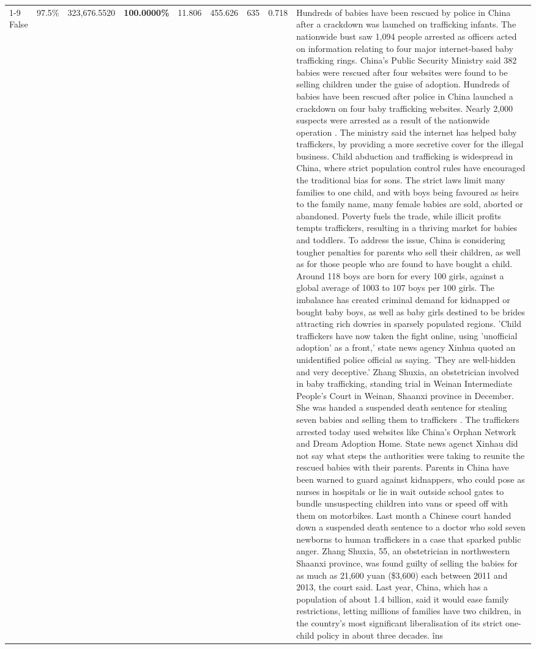 \begin{table}[H]
\begin{tabular}{lllrlllll}
\cline{1-9}
False & 97.5\% & 323,676.5520 & \bfseries \color{red} 100.0000\% & 11.806 & 455.626 & 635 & 0.718 & Hundreds of babies have been rescued by police in China after a crackdown was launched on trafficking infants. The nationwide bust saw 1,094 people arrested as officers acted on information relating to four major internet-based baby trafficking rings. China's Public Security Ministry said 382 babies were rescued after four websites were found to be selling children under the guise of adoption. Hundreds of babies have been rescued after police in China launched a crackdown on four baby trafficking websites. Nearly 2,000 suspects were arrested as a result of the nationwide operation . The ministry said the internet has helped baby traffickers, by providing a more secretive cover for the illegal business. Child abduction and trafficking is widespread in China, where strict population control rules have encouraged the traditional bias for sons. The strict laws limit many families to one child, and with boys being favoured as heirs to the family name, many female babies are sold, aborted or abandoned. Poverty fuels the trade, while illicit profits tempts traffickers, resulting in a thriving market for babies and toddlers. To address the issue, China is considering tougher penalties for parents who sell their children, as well as for those people who are found to have bought a child. Around 118 boys are born for every 100 girls, against a global average of 1003 to 107 boys per 100 girls. The imbalance has created criminal demand for kidnapped or bought baby boys, as well as baby girls destined to be brides attracting rich dowries in sparsely populated regions. 'Child traffickers have now taken the fight online, using 'unofficial adoption' as a front,' state news agency Xinhua quoted an unidentified police official as saying. 'They are well-hidden and very deceptive.' Zhang Shuxia, an obstetrician involved in baby trafficking, standing trial in Weinan Intermediate People's Court in Weinan, Shaanxi province in December. She was handed a suspended death sentence for stealing seven babies and selling them to traffickers . The traffickers arrested today used websites like China's Orphan Network and Dream Adoption Home. State news agenct Xinhau did not say what steps the authorities were taking to reunite the rescued babies with their parents. Parents in China have been warned to guard against kidnappers, who could pose as nurses in hospitals or lie in wait outside school gates to bundle unsuspecting children into vans or speed off with them on motorbikes. Last month a Chinese court handed down a suspended death sentence to a doctor who sold seven newborns to human traffickers in a case that sparked public anger. Zhang Shuxia, 55, an obstetrician in northwestern Shaanxi province, was found guilty of selling the babies for as much as 21,600 yuan (\$3,600) each between 2011 and 2013, the court said. Last year, China, which has a population of about 1.4 billion, said it would ease family restrictions, letting millions of families have two children, in the country's most significant liberalisation of its strict one-child policy in about three decades. îns \\

\end{tabular}
\end{table}
